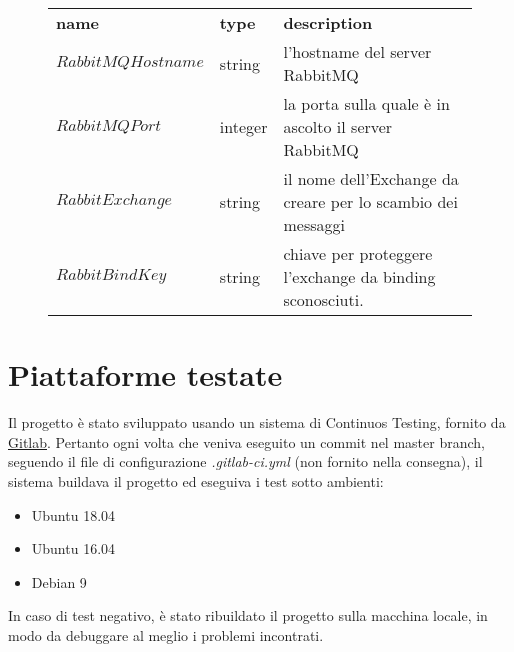 \documentclass[]{article}
\begin{document}
\begin{figure}[H]
	\begin{table}[H]
		\begin{tabular}{lll}			
			\textbf{name} & \textbf{type} & \textbf{description} \\
			$RabbitMQHostname$ & string & l'hostname del server RabbitMQ \\ 
			$RabbitMQPort$ & integer & la porta sulla quale \`e in ascolto il server RabbitMQ \\
			$RabbitExchange$ & string & il nome dell'Exchange da creare per lo scambio dei messaggi \\
			$RabbitBindKey$ & string & chiave per proteggere l'exchange da binding sconosciuti. \\
		\end{tabular}
	\end{table}
\end{figure}

\section{Piattaforme testate}
Il progetto \`e stato sviluppato usando un sistema di Continuos Testing, fornito da \href{https://www.gitlab.com/}{Gitlab}.
Pertanto ogni volta che veniva eseguito un commit nel master branch,  seguendo il file di configurazione
\textit{.gitlab-ci.yml} (non fornito nella consegna), il sistema buildava il progetto ed eseguiva i test sotto ambienti:
\begin{itemize}
	\item Ubuntu 18.04
	\item Ubuntu 16.04
	\item Debian 9
\end{itemize}
In caso di test negativo, \`e stato ribuildato il progetto sulla macchina locale, in modo da debuggare al meglio
i problemi incontrati.
\end{document}
